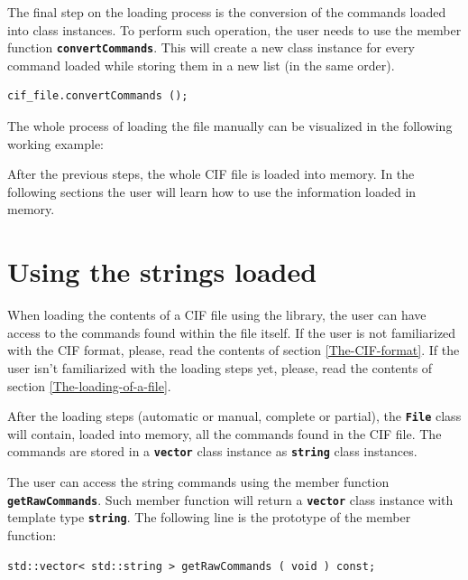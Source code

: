 \documentclass[11pt,twoside,openany,x11names,svgnames]{memoir}
\begin{document}
The final step on the loading process is the conversion of the commands loaded into class instances. To perform such operation, the user needs to use the member function \textbf{\texttt{convertCommands}}. This will create a new class instance for every command loaded while storing them in a new list (in the same order).

\begin{lstlisting}[frame=single,style=CPPStyle]
cif_file.convertCommands ();
\end{lstlisting}

The whole process of loading the file manually can be visualized in the following working example:



After the previous steps, the whole CIF file is loaded into memory. In the following sections the user will learn how to use the information loaded in memory.

\section{Using the strings loaded}\label{Using-the-strings-loaded}

When loading the contents of a CIF file using the library, the user can have access to the commands found within the file itself. If the user is not familiarized with the CIF format, please, read the contents of section \ref{The-CIF-format}. If the user isn't familiarized with the loading steps yet, please, read the contents of section \ref{The-loading-of-a-file}.

After the loading steps (automatic or manual, complete or partial), the \textbf{\texttt{File}} class will contain, loaded into memory, all the commands found in the CIF file. The commands are stored in a \textbf{\texttt{vector}} class instance as \textbf{\texttt{string}} class instances.

The user can access the string commands using the member function \textbf{\texttt{getRawCommands}}. Such member function will return a \textbf{\texttt{vector}} class instance with template type \textbf{\texttt{string}}. The following line is the prototype of the member function:

\begin{lstlisting}[frame=single,style=CPPStyle]
std::vector< std::string > getRawCommands ( void ) const;
\end{lstlisting}
\end{document}
